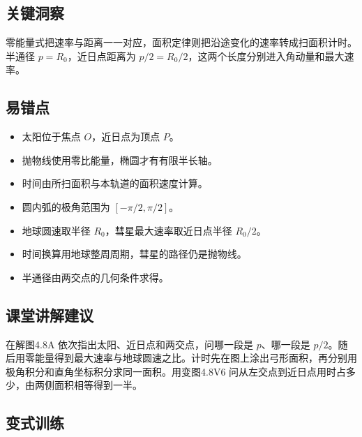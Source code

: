 \documentclass[UTF8,fontset=fandol,a4paper,11pt]{ctexart}
\begin{document}


\subsection*{关键洞察}

零能量式把速率与距离一一对应，面积定律则把沿途变化的速率转成扫面积计时。半通径 $p=R_0$，近日点距离为 $p/2=R_0/2$，这两个长度分别进入角动量和最大速率。



\subsection*{易错点}

\begin{itemize}
\item 太阳位于焦点 $O$，近日点为顶点 $P$。
\item 抛物线使用零比能量，椭圆才有有限半长轴。
\item 时间由所扫面积与本轨道的面积速度计算。
\item 圆内弧的极角范围为 $[-\pi/2,\pi/2]$。
\item 地球圆速取半径 $R_0$，彗星最大速率取近日点半径 $R_0/2$。
\item 时间换算用地球整周周期，彗星的路径仍是抛物线。
\item 半通径由两交点的几何条件求得。
\end{itemize}



\subsection*{课堂讲解建议}

在解图4.8A 依次指出太阳、近日点和两交点，问哪一段是 $p$、哪一段是 $p/2$。随后用零能量得到最大速率与地球圆速之比。计时先在图上涂出弓形面积，再分别用极角积分和直角坐标积分求同一面积。用变图4.8V6 问从左交点到近日点用时占多少，由两侧面积相等得到一半。



\subsection*{变式训练}
\end{document}
